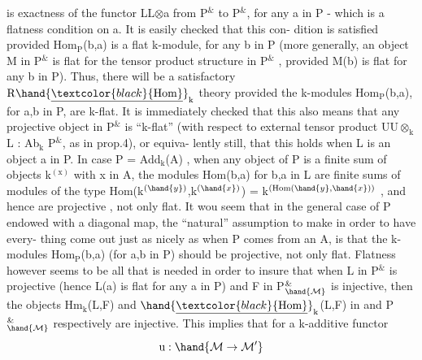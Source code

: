 
is exactness of the functor  L\hand{$\mapsto$}L$\otimes$a  from P$^{\&}$ to P$^{\&}$, for any a in P
- which is a flatness condition on a.  It is easily checked that this con-%
dition is satisfied provided  Hom$_{\mathrm{P}}$(b,a)  is a flat k-module,  for any
b in P (more generally,  an object M in P$^{\&}$ is flat for the tensor product
structure in P$^{\&}$ ,  provided M(b) is flat for any b in P).  Thus,  there
will be a satisfactory $\mathrm{R}\hand{\underline{\textcolor{black}{\mathrm{Hom}}}}_{\mathrm{k}}$ theory provided the k-modules Hom$_{\mathrm{P}}$(b,a),
for a,b in P,  are k-flat.  It is immediately checked that this also
means that any projective object  in P$^{\&}$ is ``k-flat'' (with respect to
external tensor product U\hand{$\mapsto$}U$\otimes_{\mathrm{k}}$L  :  Ab$_{\mathrm{k}}$ \hand{$\to$}P$^{\&}$, as in prop.4), or equiva-%
lently still,  that this holds when L is an object a in P.  In case
P = Add$_{\mathrm{k}}$(A) ,  when any object of P is a finite sum of objects k$^{(\mathrm{x})}$ with
x in A,  the modules Hom(b,a) for b,a in L are finite sums of modules
of the type  Hom(k$^{(\hand{y})}$,k$^{(\hand{x})}$) = k$^{(\mathrm{Hom}(\hand{y},\hand{x}))}$ , and hence are projective ,
not only flat.  It wou seem that in the general case of P endowed with
a diagonal map,  the ``natural'' assumption to make in order to have every-%
thing come out just as nicely as when P comes from an A,  is that the
k-modules Hom$_{\mathrm{P}}$(b,a)  (for a,b in P)  should be projective,  not only
flat.  Flatness however seems to be all that is needed in order to insure
that when L in P$^{\&}$ is projective  (hence L(a) is flat for any a in P)
and F in P$^{\&}_{\hand{\mathcal{M}}}$ is injective,  then the objects Hm$_{\mathrm{k}}$(L,F)  and $\hand{\underline{\textcolor{black}{\mathrm{Hom}}}}_{\mathrm{k}}$(L,F)
in  and  P$^{\&}_{\hand{\mathcal{M}}}$ respectively are injective.  This implies that for a
 k-additive functor
\[ \mathrm{u}: \hand{\mathcal{M}\to\mathcal{M}'} \]

